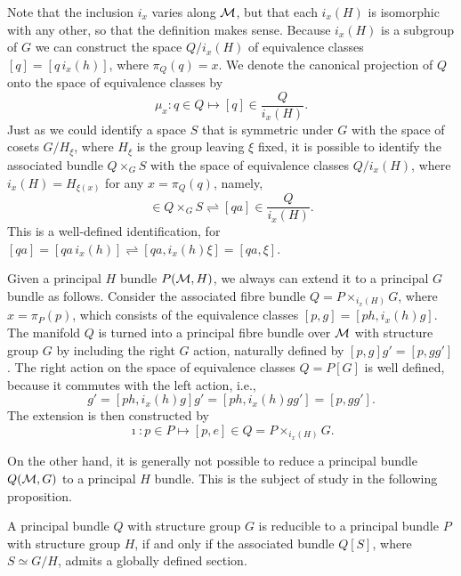 \documentclass[
final,
11pt,
a4paper,
DIV=11,
headinclude=true,
footinclude=false,
bibliography=totoc,
twoside=true,  %
BCOR=5mm
]{scrbook}
\begin{document}
Note that the inclusion $i_x$ varies along $\mathcal{M}$, but that 
each $i_x(H)$ is isomorphic with any other, so that the 
definition makes sense. Because $i_x(H)$ is a subgroup of $G$ we 
can construct the space $Q/i_x(H)$ of equivalence classes $[q] 
= [q\, i_x(h)]$, where $\pi_Q(q) = x$.  We denote the canonical 
projection of $Q$ onto the space of equivalence classes by
\begin{equation*}
  \mu_x : q \in Q \mapsto [q] \in \frac{Q}{i_x(H)}.
\end{equation*}
Just as we could identify a space $S$ that is symmetric under $G$ 
with the space of cosets $G/H_\xi$, where $H_\xi$ is the group 
leaving $\xi$ fixed, it is possible to identify the associated 
bundle $Q \times_G S$ with the space of equivalence classes 
$Q/i_x(H)$, where $i_x(H) = H_{\xi(x)}$ for any $x = \pi_Q(q)$, 
namely,
\begin{equation*}
  [q,a\xi] \in Q \times_G S
  \rightleftharpoons
  [qa] \in \frac{Q}{i_x(H)}.
\end{equation*}
This is a well-defined identification, for $[qa] = [qa\, i_x(h)] 
\rightleftharpoons [qa, i_x(h) \xi] = [qa, \xi]$.

Given a principal $H$ bundle $P(\mathcal{M},H)$, we always can extend 
it to a principal $G$ bundle as follows. Consider the associated 
fibre bundle $Q = P \times_{i_x(H)} G$, where $x = \pi_P(p)$, 
which consists of the equivalence classes $[p,g] = [ph,i_x(h)g]$.  
The manifold $Q$ is turned into a principal fibre bundle over 
$\mathcal{M}$ with structure group $G$ by including the right $G$ 
action, naturally defined by $[p,g]g' = [p,gg']$. The right 
action on the space of equivalence classes $Q = P[G]$ is well 
defined, because it commutes with the left action, i.e.,
\begin{equation*}
  [p,g]g' = [ph,i_x(h)g]g' = [ph,i_x(h)gg'] = [p,gg'].
\end{equation*}
The extension is then constructed by
\begin{equation*}
  \imath : p \in P \mapsto [p,e] \in Q = P \times_{i_x(H)} G.
\end{equation*}

On the other hand, it is generally not possible to reduce a 
principal bundle $Q(\mathcal{M},G)$ to a principal $H$ bundle. This is 
the subject of study in the following proposition.

\begin{proposition}
A principal bundle $Q$ with structure group $G$ is reducible to a 
principal bundle $P$ with structure group $H$, if and only if the 
associated bundle $Q[S]$, where $S \simeq G/H$, admits a globally 
defined section.
\end{proposition}
\end{document}
